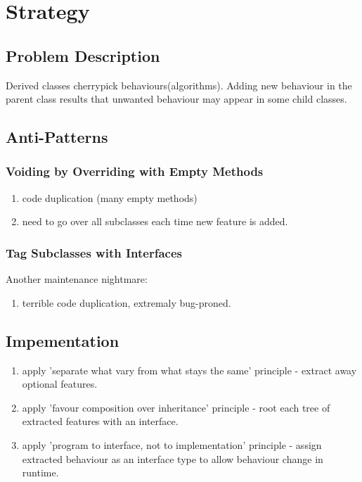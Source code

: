 \documentclass{report}
\begin{document}
\section{Strategy}

\subsection{Problem Description}
Derived classes cherrypick behaviours(algorithms). Adding new behaviour in the parent class results
that unwanted behaviour may appear in some child classes. 
 
\subsection{Anti-Patterns}
\subsubsection{Voiding by Overriding with Empty Methods}
\begin{enumerate}
  \item code duplication (many empty methods)
  \item need to go over all subclasses each time new feature is added.
\end{enumerate}

\subsubsection{Tag Subclasses with Interfaces}
Another maintenance nightmare:
\begin{enumerate}
  \item terrible code duplication, extremaly bug-proned.
\end{enumerate}

\subsection{Impementation}
\begin{enumerate}
  \item apply 'separate what vary from what stays the same' principle - extract away optional features.
  \item apply 'favour composition over inheritance' principle - root each tree of extracted features with an
  interface.
  \item apply 'program to interface, not to implementation' principle - assign extracted behaviour as an 
  interface type to allow behaviour change in runtime.
\end{enumerate}
\end{document}
